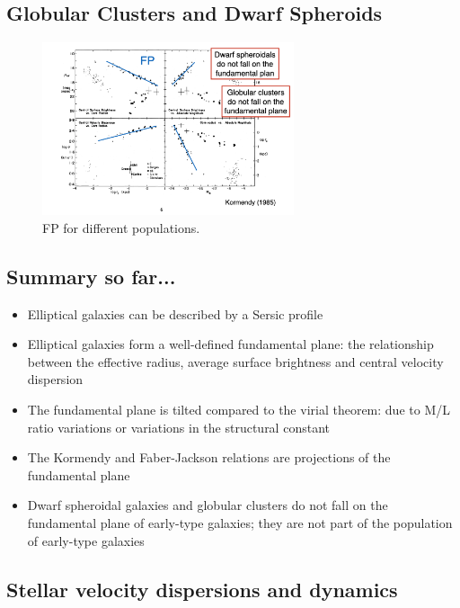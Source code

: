 \documentclass{article}
\begin{document}
\subsection{Globular Clusters and Dwarf Spheroids}

\begin{figure}
    \centering
    \includegraphics[width=0.66\textwidth]{figs/Screen Shot 2021-10-20 at 10.14.18 AM.png}
    \caption{FP for different populations.}
    \label{fig:fundamental_plane_for_different_galaxies}
\end{figure}

\subsection{Summary so far...}

\begin{itemize}
    \item Elliptical galaxies can be described by a Sersic profile
    \item Elliptical galaxies form a well-defined fundamental plane: the relationship between the effective radius, average surface brightness and central velocity dispersion
    \item The fundamental plane is tilted compared to the virial theorem: due to M/L ratio variations or variations in the structural constant 
    \item The Kormendy and Faber-Jackson relations are projections of the fundamental plane
    \item Dwarf spheroidal galaxies and globular clusters do not fall on the fundamental plane of early-type galaxies; they are not part of the population of early-type galaxies
\end{itemize}

\subsection{Stellar velocity dispersions and dynamics}
\end{document}

